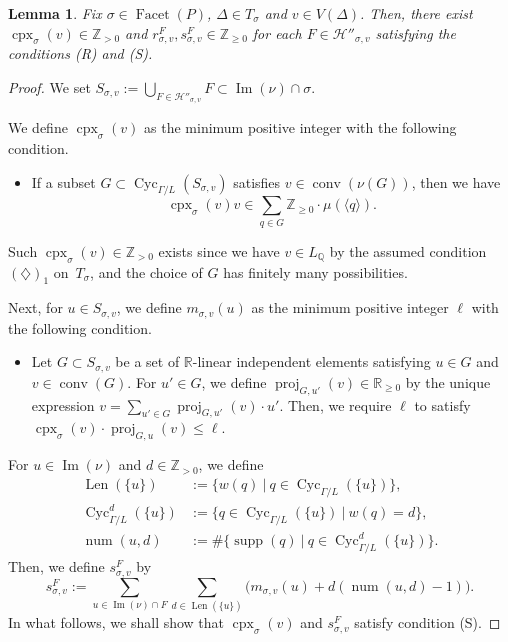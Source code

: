 \documentclass[11pt]{article}
\newtheorem{lem}[theo]{Lemma}
\theoremstyle{definition}
\numberwithin{equation}{section}
\begin{document}
\begin{lem}\label{lem:r}
Fix $\sigma \in \operatorname{Facet}(P)$, $\Delta \in T_{\sigma}$ and $v \in V(\Delta)$. 
Then, there exist $\operatorname{cpx}_{\sigma}(v) \in \mathbb{Z}_{> 0}$ and  
$r^{F} _{\sigma, v}, s^{F} _{\sigma, v} \in \mathbb{Z}_{\ge 0}$ for each $F \in \mathcal{H}'' _{\sigma, v}$ satisfying the conditions (R) and (S). 
\end{lem}
\begin{proof}
We set $S_{\sigma, v} := \bigcup _{F \in \mathcal{H}'' _{\sigma, v}} F \subset \operatorname{Im}(\nu) \cap \sigma$. 

We define $\operatorname{cpx}_{\sigma}(v)$ as the minimum positive integer with the following condition. 
\begin{itemize}
\item 
If a subset $G \subset \operatorname{Cyc}_{\Gamma /L}(S_{\sigma, v})$ satisfies $v \in \operatorname{conv}( \nu(G) )$, 
then we have 
\[
\operatorname{cpx}_{\sigma}(v) v \in \sum _{q \in G} \mathbb{Z}_{\ge 0} \cdot \mu ( \langle q \rangle ). 
\]
\end{itemize}
\noindent
Such $\operatorname{cpx}_{\sigma}(v) \in \mathbb{Z}_{>0}$ exists 
since we have $v \in L_{\mathbb{Q}}$ by the assumed condition $(\diamondsuit)_1$ on~$T_{\sigma}$, 
and the choice of $G$ has finitely many possibilities. 

Next, for $u \in S_{\sigma, v}$, 
we define $m_{\sigma, v}(u)$ as the minimum positive integer $\ell$ with the following condition. 
\begin{itemize}
\item
Let $G \subset S_{\sigma, v}$ be 
a set of $\mathbb{R}$-linear independent elements satisfying $u \in G$ and $v \in \operatorname{conv}(G)$. 
For $u' \in G$, we define $\operatorname{proj}_{G,u'}(v) \in \mathbb{R}_{\ge 0}$ by the unique expression 
$v = \sum _{u' \in G} \operatorname{proj}_{G,u'}(v) \cdot u'$. 
Then, we require $\ell$ to satisfy \mbox{$\operatorname{cpx}_{\sigma}(v) \cdot \operatorname{proj}_{G,u}(v) \le \ell$}. 
\end{itemize}

For $u \in \operatorname{Im}(\nu)$ and $d \in \mathbb{Z}_{>0}$, we define 
\begin{align*}
\operatorname{Len} (\{ u \}) 
&:= \bigl \{ w(q) \ \big| \ q \in \operatorname{Cyc}_{\Gamma /L} (\{ u \}) \bigr \}, \\
\operatorname{Cyc}_{\Gamma /L} ^d (\{ u \}) 
&:= \bigl \{ q \in \operatorname{Cyc}_{\Gamma /L} (\{ u \}) \ \big| \ w(q) = d \bigr \}, \\
\operatorname{num}(u,d) 
&:= \# \bigl\{ \operatorname{supp}(q) \ \big| \  q \in \operatorname{Cyc}_{\Gamma /L}^d (\{ u \}) \bigr \}. 
\end{align*}
Then, we define $s^{F} _{\sigma, v}$ by 
\[
s^{F} _{\sigma, v} := 
\sum_{u \in \operatorname{Im}(\nu) \cap F} 
\sum_{d \in \operatorname{Len} (\{ u \})}
\bigl( m_{\sigma, v}(u) + d (\operatorname{num}(u,d) - 1) \bigr).
\]
In what follows, we shall show that $\operatorname{cpx}_{\sigma}(v)$ and $s^{F} _{\sigma, v}$ satisfy condition (S). 


\end{proof}
\end{document}

